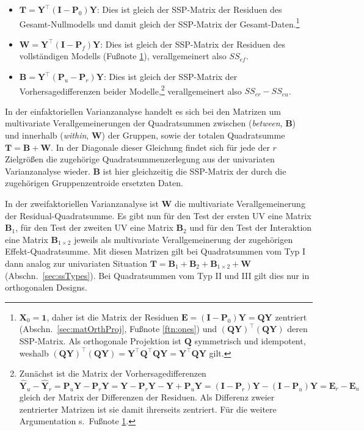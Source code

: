 \begin{itemize}
\item $\bm{T} = \bm{Y}^{\top} (\bm{I} - \bm{P}_{0}) \bm{Y}$: Dies ist gleich der SSP-Matrix der Residuen des Gesamt-Nullmodells und damit gleich der SSP-Matrix der Gesamt-Daten.\footnote{\label{ftn:ssp}$\bm{X}_{0} = \bm{1}$, daher ist die Matrix der Residuen $\bm{E} = (\bm{I} - \bm{P}_{0}) \bm{Y} = \bm{Q} \bm{Y}$ zentriert (Abschn.\ \ref{sec:matOrthProj}, Fußnote \ref{ftn:ones}) und $(\bm{Q} \bm{Y})^{\top} (\bm{Q} \bm{Y})$ deren SSP-Matrix. Als orthogonale Projektion ist $\bm{Q}$ symmetrisch und idempotent, weshalb $(\bm{Q} \bm{Y})^{\top} (\bm{Q} \bm{Y}) = \bm{Y}^{\top} \bm{Q}^{\top} \bm{Q} \bm{Y} = \bm{Y}^{\top} \bm{Q} \bm{Y}$ gilt.}
\item $\bm{W} = \bm{Y}^{\top} (\bm{I} - \bm{P}_{f}) \bm{Y}$: Dies ist gleich der SSP-Matrix der Residuen des vollständigen Modells (Fußnote \ref{ftn:ssp}), verallgemeinert also $SS_{ef}$.
\item $\bm{B} = \bm{Y}^{\top} (\bm{P}_{u} - \bm{P}_{r}) \bm{Y}$: Dies ist gleich der SSP-Matrix der Vorhersagedifferenzen beider Modelle,\footnote{Zunächst ist die Matrix der Vorhersagedifferenzen $\hat{\bm{Y}}_{u} - \hat{\bm{Y}}_{r} = \bm{P}_{u} \bm{Y} - \bm{P}_{r} \bm{Y} = \bm{Y} - \bm{P}_{r} \bm{Y} - \bm{Y} + \bm{P}_{u} \bm{Y} = (\bm{I} - \bm{P}_{r}) \bm{Y} - (\bm{I} - \bm{P}_{u}) \bm{Y} = \bm{E}_{r} - \bm{E}_{u}$ gleich der Matrix der Differenzen der Residuen. Als Differenz zweier zentrierter Matrizen ist sie damit ihrerseits zentriert. Für die weitere Argumentation s.\ Fußnote \ref{ftn:ssp}.} verallgemeinert also $SS_{er} - SS_{eu}$.
\end{itemize}

In der einfaktoriellen Varianzanalyse handelt es sich bei den Matrizen um multivariate Verallgemeinerungen der Quadratsummen zwischen (\emph{between}, $\bm{B}$) und innerhalb (\emph{within}, $\bm{W}$) der Gruppen, sowie der totalen Quadratsumme $\bm{T} = \bm{B} + \bm{W}$. In der Diagonale dieser Gleichung findet sich für jede der $r$ Zielgrößen die zugehörige Quadratsummenzerlegung aus der univariaten Varianzanalyse wieder. $\bm{B}$ ist hier gleichzeitig die SSP-Matrix der durch die zugehörigen Gruppenzentroide ersetzten Daten.

In der zweifaktoriellen Varianzanalyse ist $\bm{W}$ die multivariate Verallgemeinerung der Residual-Quadratsumme. Es gibt nun für den Test der ersten UV eine Matrix $\bm{B}_{1}$, für den Test der zweiten UV eine Matrix $\bm{B}_{2}$ und für den Test der Interaktion eine Matrix $\bm{B}_{1 \times 2}$ jeweils als multivariate Verallgemeinerung der zugehörigen Effekt-Quadratsumme. Mit diesen Matrizen gilt bei Quadratsummen vom Typ I dann analog zur univariaten Situation $\bm{T} = \bm{B}_{1} + \bm{B}_{2} + \bm{B}_{1 \times 2} + \bm{W}$ (Abschn.\ \ref{sec:ssTypes}). Bei Quadratsummen vom Typ II und III gilt dies nur in orthogonalen Designs.

